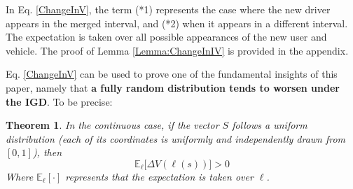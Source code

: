 \documentclass[12pt,english]{article}
\newtheorem{theorem}{Theorem}
\begin{document}

In Eq. \eqref{ChangeInV}, the term (*1) represents the case where the new driver appears in the merged interval, and (*2) when it appears in a different interval. The expectation is taken over all possible appearances of the new user and vehicle.
The proof of Lemma \ref{Lemma:ChangeInIV} is provided in the appendix.

 Eq. \eqref{ChangeInV} can be used to prove one of the fundamental insights of this paper, namely that \textbf{a fully random distribution tends to worsen under the IGD}. To be precise:
 
 \begin{theorem} \label{thm:IGDWorseThanUniform}
In the continuous case, if the vector $S$ follows a uniform distribution (each of its coordinates is uniformly and independently drawn from $[0,1]$), then
\begin{equation}
    \mathbb{E}_\ell\big[\Delta V(\ell(s))\big]>0
\end{equation}
Where $\mathbb{E}_\ell[\cdot]$ represents that the expectation is taken over $\ell$. 


 \end{theorem}
\end{document}
